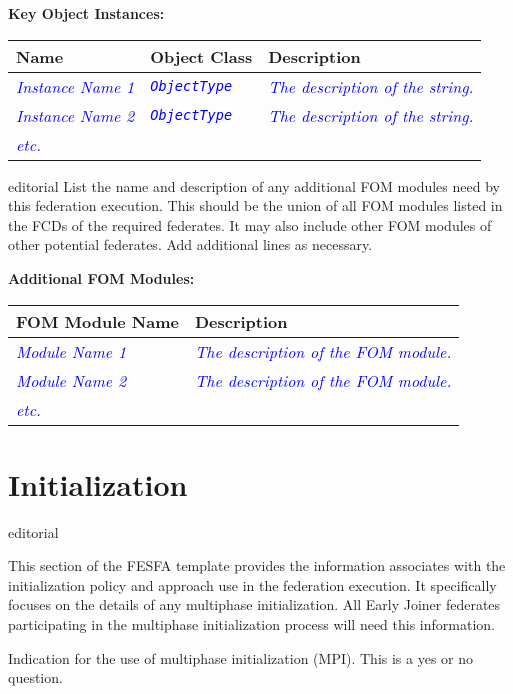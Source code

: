 \documentclass[11pt,english,letterpaper]{article}
\newcommand{\example}[1]{{\textcolor{blue}{\textit{#1}}}}
\begin{document}
\textbf{Key Object Instances: }

\begin{tabularx}{\textwidth}{|l|l|X|} \hline
Name & Object Class & Description \\ \hline
\example{Instance Name 1} & \example{\texttt{ObjectType}} &
\example{The description of the string.} \\ \hline
\example{Instance Name 2} & \example{\texttt{ObjectType}} &
\example{The description of the string.} \\ \hline
\example{etc.} & \\ \hline
\end{tabularx}

\begin{shownto}{editorial}
{\color{red} List the name and description of any additional FOM modules need
by this federation execution. This should be the union of all FOM modules
listed in the FCDs of the required federates. It may also include other FOM
modules of other potential federates. Add additional lines as necessary.}
\end{shownto}

\textbf{Additional FOM Modules: }

\begin{tabularx}{\textwidth}{|l|X|} \hline
FOM Module Name & Description \\ \hline
\example{Module Name 1} & \example{The description of the FOM module.} \\ \hline
\example{Module Name 2} & \example{The description of the FOM module.} \\ \hline
\example{etc.} &  \\ \hline
\end{tabularx}


\section*{Initialization}

\begin{shownto}{editorial}
{\color{red} This section of the FESFA template provides the information
associates with the initialization policy and approach use in the federation
execution. It specifically focuses on the details of any multiphase
initialization. All Early Joiner federates participating in the multiphase
initialization process will need this information.

Indication for the use of multiphase initialization (MPI). This is a yes or no
question.}
\end{shownto}
\end{document}
